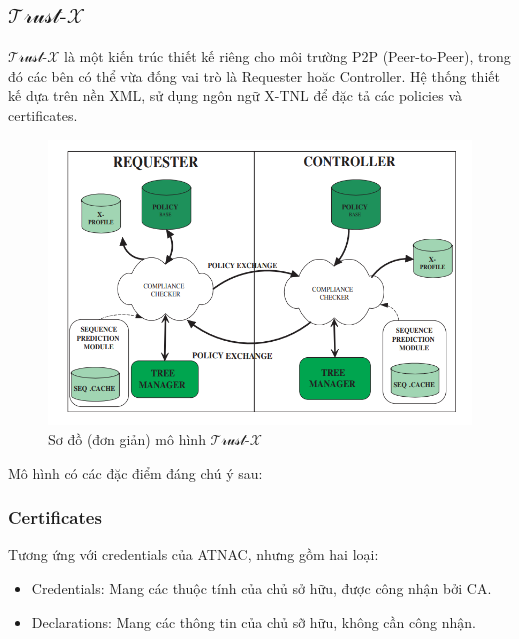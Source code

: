 \documentclass[12pt]{article}
\newcommand{\trustx}{$\mathcal{\text{Trust-}X}$}
\begin{document}
\subsection{\trustx}
\trustx\cite{10.1109/TKDE.2004.1318565} là một kiến trúc thiết kế riêng cho môi trường P2P (Peer-to-Peer), trong đó các bên có thể vừa đống vai trò là Requester hoăc Controller. Hệ thống thiết kế dựa trên nền XML, sử dụng ngôn ngữ X-TNL để đặc tả các policies và certificates. 

\begin{figure}[H]
\centering
\includegraphics[scale=.8]{img/trust-x-architecture.png}
\caption{Sơ đồ (đơn giản) mô hình \trustx}
\end{figure}

Mô hình có các đặc điểm đáng chú ý sau:

\subsubsection{Certificates}
Tương ứng với credentials của ATNAC, nhưng gồm hai loại:
\begin{itemize}
\item Credentials: Mang các thuộc tính của chủ sở hữu, được công nhận bởi CA.
\item Declarations: Mang các thông tin của chủ sỡ hữu, không cần công nhận.
\end{itemize}
\end{document}
